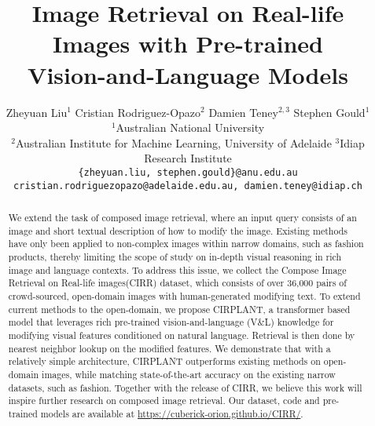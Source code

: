 \documentclass[10pt,twocolumn,letterpaper]{article}
\newcommand{\dstname}{CIRR\xspace}
\newcommand{\dstnamefull}{Compose Image Retrieval on Real-life images\xspace}
\newcommand{\modelname}{CIRPLANT\xspace}
\newcommand{\dsturl}{\url{https://cuberick-orion.github.io/CIRR/}\xspace}
\begin{document}
\title{Image Retrieval on Real-life Images with Pre-trained \\Vision-and-Language Models}

\author{Zheyuan Liu$^{1}$ \quad Cristian Rodriguez-Opazo$^{2}$ \quad Damien Teney$^{2,3}$ \quad Stephen Gould$^{1}$ \\
$^{1}$Australian National University\\
$^{2}$Australian Institute for Machine Learning, University of Adelaide\quad
$^{3}$Idiap Research Institute \\
{\tt\small \{zheyuan.liu, stephen.gould\}@anu.edu.au} \\
{\tt\small cristian.rodriguezopazo@adelaide.edu.au, damien.teney@idiap.ch}
}

\maketitle

\ificcvfinal\thispagestyle{empty}\fi

\begin{abstract}
   We extend the task of composed image retrieval, where an input query consists of an image and short textual description of how to modify the image.
   Existing methods have only been applied to non-complex images within narrow domains, such as fashion products,
   thereby limiting the scope of study on in-depth visual reasoning in rich image and language contexts.
   To address this issue, we collect the \dstnamefull (\dstname) dataset, which consists of over 36,000 pairs of crowd-sourced, open-domain images with human-generated modifying text.
   To extend current methods to the open-domain, we propose \modelname, a transformer based model that leverages rich pre-trained vision-and-language (V\&L) knowledge for modifying visual features conditioned on natural language.
   Retrieval is then done by nearest neighbor lookup on the modified features.
   We demonstrate that with a relatively simple architecture, \modelname outperforms existing methods on open-domain images, while matching state-of-the-art accuracy on the existing narrow datasets, such as fashion.
   Together with the release of \dstname, we believe this work will inspire further research on composed image retrieval.
   Our dataset, code and pre-trained models are available at \dsturl.
\end{abstract}
\end{document}
